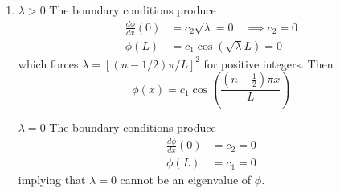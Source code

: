 \documentclass[a4paper]{article}
\begin{document}
\begin{enumerate}[label=(\alph*)]
	\underline{\( \lambda = 0 \)}
	The boundary conditions produce
	\begin{align*}
		\phi \!\left( 0 \right) & = c_{1} = 0 \\
		\frac{d \phi}{d x}\!\left( L \right) & = c_{2} = 0
	\end{align*}
	Leaving only the trivial solution, so \( \lambda = 0 \) is not an eigenvalue.

	\underline{\( \lambda < 0 \)}
	Let \( s = -\lambda \). The boundary conditions produce
	\begin{align*}
		\phi \!\left( 0 \right) & = c_{1} = 0 \\
		\frac{d \phi}{d x}\!\left( L \right) & = c_{2}\sqrt{s}\cosh\!\left(\sqrt{s}L\right) = 0 \quad \implies c_{2} = 0
	\end{align*}
	which confirms that \( \lambda < 0 \) are ineligible to be eigenvalues of the boundary value problem.
	\item \underline{\( \lambda > 0 \)}
	The boundary conditions produce
	\begin{align*}
		\frac{d \phi}{d x}\!\left( 0 \right) & = c_{2}\sqrt{\lambda} = 0 \quad \implies c_{2} = 0 \\
		\phi \!\left( L \right) & = c_{1}\cos\!\left(\sqrt{\lambda}L\right) = 0
	\end{align*}
	which forces \( \lambda = \!\left[ \!\left( n - 1/2 \right)\pi / L \right]^{2} \) for positive integers. Then
	\[
		\phi \!\left( x \right) = c_{1}\cos\!\left(\frac{\!\left( n - \frac{1}{2} \right)\pi x}{L}\right) 
	\]

	\underline{\( \lambda = 0 \)}
	The boundary conditions produce
	\begin{align*}
		\frac{d \phi}{d x}\!\left( 0 \right) & = c_{2} = 0 \\
		\phi \!\left( L \right) & = c_{1} = 0
	\end{align*}
	implying that \( \lambda = 0 \) cannot be an eigenvalue of \( \phi \).


\end{enumerate}
\end{document}
